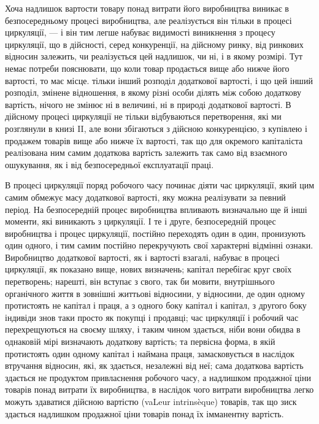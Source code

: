 Хоча надлишок вартости товару понад витрати його виробництва
виникає в безпосередньому процесі виробництва, але реалізується
він тільки в процесі циркуляції, — і він тим легше набуває видимості
виникнення з процесу циркуляції, що в дійсності, серед
конкуренції, на дійсному ринку, від ринкових відносин залежить,
чи реалізується цей надлишок, чи ні, і в якому розмірі. Тут
немає потреби пояснювати, що коли товар продається вище
або нижче його вартості, то має місце. тільки інший розподіл
додаткової вартості, і що цей інший розподіл, змінене
відношення, в якому різні особи ділять між собою додаткову вартість,
нічого не змінює ні в величині, ні в природі додаткової
вартості. В дійсному процесі циркуляції не тільки відбуваються
перетворення, які ми розглянули в книзі II, але вони збігаються
з дійсною конкуренцією, з купівлею і продажем товарів вище
або нижче їх вартості, так що для окремого капіталіста реалізована
ним самим додаткова вартість залежить так само від
взаємного ошукування, як і від безпосередньої експлуатації
праці.

В процесі циркуляції поряд робочого часу починає діяти час
циркуляції, який цим самим обмежує масу додаткової вартості,
яку можна реалізувати за певний період. На безпосередній
процес виробництва впливають визначально ще й інші моменти,
які виникають з циркуляції. І те і друге, безпосередній
процес виробництва і процес циркуляції, постійно переходять
один в один, пронизують один одного, і тим самим постійно
перекручують свої характерні відмінні ознаки. Виробництво додаткової
вартості, як і вартості взагалі, набуває в процесі циркуляції,
як показано вище, нових визначень; капітал перебігає
круг своїх перетворень; нарешті, він вступає з свого, так би
мовити, внутрішнього органічного життя в зовнішні життьові
відносини, у відносини, де один одному протистоять не капітал
і праця, а з одного боку капітал і капітал, з другого боку
індивіди знов таки просто як покупці і продавці; час циркуляції
і робочий час перехрещуються на своєму шляху, і таким
чином здається, ніби вони обидва в однаковій мірі визначають
додаткову вартість; та первісна форма, в якій протистоять один
одному капітал і наймана праця, замасковується в наслідок втручання
відносин, які, як здається, незалежні від неї; сама додаткова
вартість здається не продуктом привласнення робочого часу,
а надлишком продажної ціни товарів понад витрати їх виробництва,
в наслідок чого витрати виробництва легко можуть здаватися
дійсною вартістю (vaLeur intrinsèque) товарів, так що зиск
здається надлишком продажної ціни товарів понад їх імманентну
вартість.

